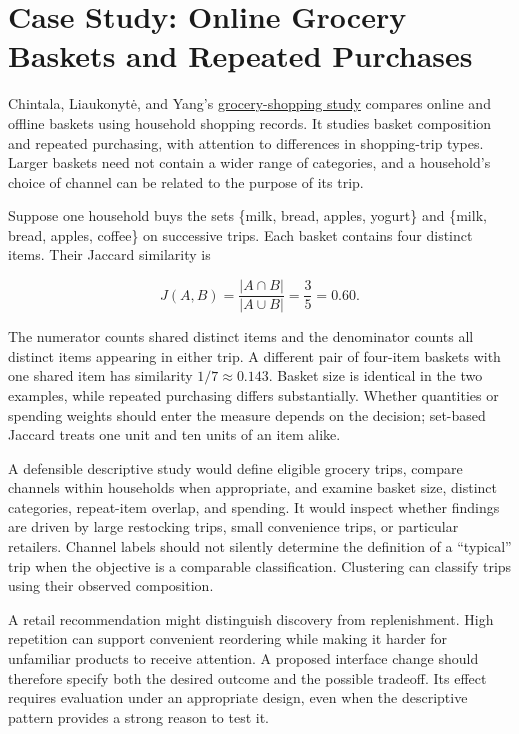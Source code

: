 \hypertarget{M02-case-study-online-grocery-baskets-and-repeated-purchases}{%
\section{Case Study: Online Grocery Baskets and Repeated
Purchases}\label{M02-case-study-online-grocery-baskets-and-repeated-purchases}}

\noindent Chintala, Liaukonytė, and Yang's
\href{https://doi.org/10.1287/mksc.2022.0292}{grocery-shopping study}
compares online and offline baskets using household shopping records. It
studies basket composition and repeated purchasing, with attention to
differences in shopping-trip types. Larger baskets need not contain a
wider range of categories, and a household's choice of channel can be
related to the purpose of its trip.

Suppose one household buys the sets \{milk, bread, apples, yogurt\} and
\{milk, bread, apples, coffee\} on successive trips. Each basket
contains four distinct items. Their Jaccard similarity is

\[
J(A,B)=\frac{|A\cap B|}{|A\cup B|}=\frac{3}{5}=0.60.
\]

The numerator counts shared distinct items and the denominator counts
all distinct items appearing in either trip. A different pair of
four-item baskets with one shared item has similarity
\(1/7\approx0.143\). Basket size is identical in the two examples, while
repeated purchasing differs substantially. Whether quantities or
spending weights should enter the measure depends on the decision;
set-based Jaccard treats one unit and ten units of an item alike.

A defensible descriptive study would define eligible grocery trips,
compare channels within households when appropriate, and examine basket
size, distinct categories, repeat-item overlap, and spending. It would
inspect whether findings are driven by large restocking trips, small
convenience trips, or particular retailers. Channel labels should not
silently determine the definition of a ``typical'' trip when the
objective is a comparable classification. Clustering can classify trips
using their observed composition.

A retail recommendation might distinguish discovery from replenishment.
High repetition can support convenient reordering while making it harder
for unfamiliar products to receive attention. A proposed interface
change should therefore specify both the desired outcome and the
possible tradeoff. Its effect requires evaluation under an appropriate
design, even when the descriptive pattern provides a strong reason to
test it.

